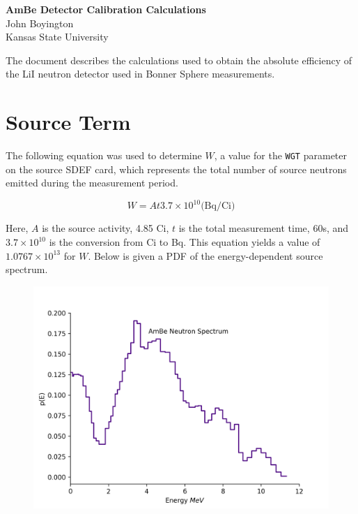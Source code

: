 \documentclass[a4paper, 11pt]{article}
\begin{document}
\thispagestyle{empty}
\noindent
\large\textbf{AmBe Detector Calibration Calculations} \\
\hfill John Boyington \\
\hfill Kansas State University \\

\vspace{0.03\textheight}


The document describes the calculations used to obtain the absolute efficiency of the LiI neutron detector used in Bonner Sphere measurements.

\section{Source Term}

The following equation was used to determine $W$, a value for the {\tt WGT} parameter on the source SDEF card, which represents the total number of source neutrons emitted during the measurement period.

$$ W = A t 3.7 \times 10^{10} \textrm{(Bq/Ci)} $$

Here, $A$ is the source activity, 4.85 Ci, $t$ is the total measurement time, 60s, and $3.7 \times 10^{10}$ is the conversion from Ci to Bq. This equation yields a value of $1.0767 \times 10^{13}$ for $W$. Below is given a PDF of the energy-dependent source spectrum.


\begin{figure}[hb]

\includegraphics[]{ambe_bare}
\end{figure}
\end{document}
